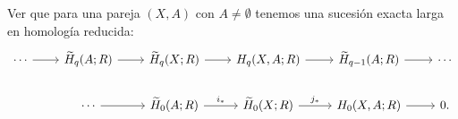\begin{ejercicio}
Ver que para una pareja $(X, A)$ con $A \neq \emptyset$ tenemos una sucesión exacta larga en homología reducida:
\[
\begin{tikzcd}[column sep=2.2em, row sep=1.8em]
\cdots \arrow[r] & \widetilde{H}_q(A; R) \arrow[r] & \widetilde{H}_q(X; R) \arrow[r] & H_q(X, A; R) \arrow[r] & \widetilde{H}_{q-1}(A; R) \arrow[r] & \cdots \\
& \cdots \arrow[r] & \widetilde{H}_0(A; R) \arrow[r, "i_*"] & \widetilde{H}_0(X; R) \arrow[r, "j_*"] & H_0(X, A; R) \arrow[r] & 0.
\end{tikzcd}
\]
\end{ejercicio}

\begin{demostracion}

\end{demostracion}

